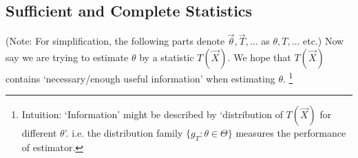     




\subsection{Sufficient and Complete Statistics}\label{SubSectionSufficient_CompleteStatistics}
    (Note: For simplification, the following parts denote $\vec{\theta},\vec{T},\ldots$  as $\theta,T,\ldots$ etc.) Now say we are trying to estimate $ \theta  $ by a statistic $ T(\vec{X}) $. We hope that $ T(\vec{X}) $ contains `necessary/enough useful information' when estimating $ \theta  $. \footnote{Intuition: `Information' might be described by `distribution of $ T(\vec{X}) $ for different $ \theta  $'. i.e. the distribution family $ \{g_T:\theta \in\Theta \} $ measures the performance of estimator.}

